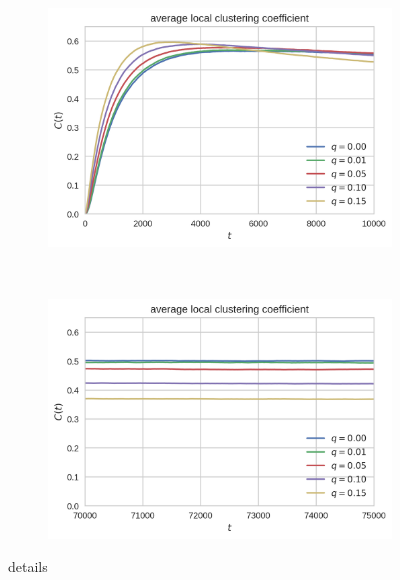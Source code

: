 \begin{figure}[htbp]
  \centering
  \begin{subfigure}[b]{0.48\textwidth}
    \includegraphics[width=\textwidth]{figures/avg-local-cc-start}
    \caption{}
    \label{subfig:avg-local-cc-start}
  \end{subfigure}
  ~
  \begin{subfigure}[b]{0.48\textwidth}
    \includegraphics[width=\textwidth]{figures/avg-local-cc-end}
    \caption{}
    \label{subfig:avg-local-cc-end}
  \end{subfigure}

  \caption[details]{details}
  \label{fig:avg-local-cc-start-and-end}
\end{figure}




